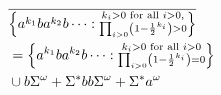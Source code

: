 \documentclass{beamer}
\begin{document}
\begin{frame}
\begin{columns}
\begin{column}{0.5\textwidth}
\begin{overlayarea}{\textwidth}{\textheight}
\begin{onlyenv}
\begin{uncoverenv}
              \begin{align*}
                &\overline{\left\{
                  a^{k_{1}}ba^{k_{2}}b\dots:
                  \substack{k_{i}>0\text{ for all }i>0,\\
                  \prod_{i>0}\left(1-\frac{1}{2}^{k_{i}}\right) > 0}
                \right\}}\\
                &= \left\{
                  a^{k_{1}}ba^{k_{2}}b\dots:
                  \substack{k_{i}>0\text{ for all }i>0\\
                  \prod_{i>0}\left(1-\frac{1}{2}^{k_{i}}\right) = 0}
                \right\}\\
                &\cup b\Sigma^{\omega} + \Sigma^{*}bb\Sigma^{\omega}
                + \Sigma^{*}a^{\omega}\\
              \end{align*}
            \end{uncoverenv}
          \end{onlyenv}
        \end{overlayarea}
      \end{column}
    \end{columns}
  \end{frame}
\end{document}
